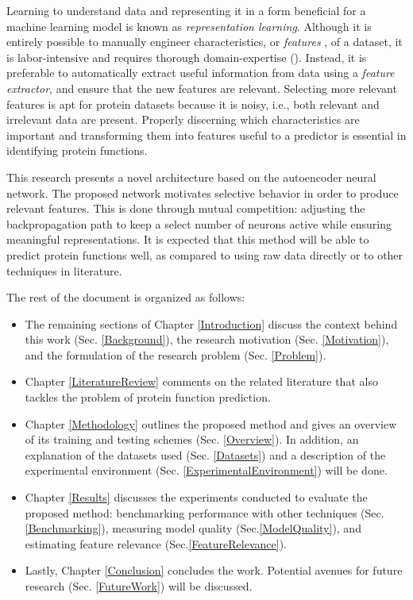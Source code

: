 \par Learning to understand data and representing it in a form beneficial for a
machine learning model is known as \textit{representation learning}. Although
it is entirely possible to manually engineer characteristics, or \textit{features}
, of a dataset, it is labor-intensive and requires thorough domain-expertise 
(\cite{bengio2013representation}).  Instead, it is preferable to automatically
extract useful information from data using a \textit{feature extractor}, and
ensure that the new features are relevant. Selecting more relevant features is
apt for protein datasets because it is noisy, i.e., both relevant and irrelevant
data are present. Properly discerning which characteristics are important and 
transforming them into features useful to a predictor is essential in
identifying protein functions.

\par This research presents a novel architecture based on the autoencoder neural
network. The proposed network motivates selective behavior in order to produce
relevant features. This is done through mutual competition: adjusting the
backpropagation path to keep a select number of neurons active while ensuring
meaningful representations. It is expected that this method will be able to
predict protein functions well, as compared to using raw data directly or to
other techniques in literature. 

\newpage

\par \noindent The rest of the document is organized as follows:

\begin{itemize} 
    \item The remaining sections of Chapter \ref{Introduction}
        discuss the context behind this work (Sec. \ref{Background}), the
        research motivation (Sec. \ref{Motivation}), and the formulation of the
        research problem (Sec. \ref{Problem}).  
    \item Chapter \ref{LiteratureReview} comments on the related literature
        that also tackles the problem of protein function prediction. 
    \item Chapter \ref{Methodology} outlines the proposed method
        and gives an overview of its training and testing schemes (Sec. 
        \ref{Overview}). In addition, an explanation of the datasets used (Sec.
        \ref{Datasets}) and a description of the experimental environment
        (Sec. \ref{ExperimentalEnvironment}) will be done. 
    \item Chapter \ref{Results} discusses the experiments conducted to evaluate the 
        proposed method: benchmarking performance with other techniques 
        (Sec. \ref{Benchmarking}), measuring model quality (Sec.\ref{ModelQuality}),
        and estimating feature relevance (Sec.\ref{FeatureRelevance}).
    \item Lastly, Chapter \ref{Conclusion} concludes the work. Potential avenues for 
        future research (Sec. \ref{FutureWork}) will be discussed.
\end{itemize}


